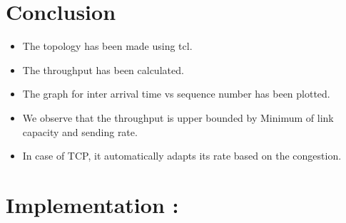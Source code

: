 \documentclass[a4paper,12pt]{article}
\begin{document}
\section{Conclusion}
\begin{itemize}
 \item The topology has been made using tcl.
 \item The throughput has been calculated.
 \item The graph for inter arrival time vs sequence number has been plotted.
 \item We observe that the throughput is upper bounded by Minimum of link capacity and sending rate.
 \item In case of TCP, it automatically adapts its rate based on the congestion.
\end{itemize}
\newpage
\section{Implementation :}
\end{document}
